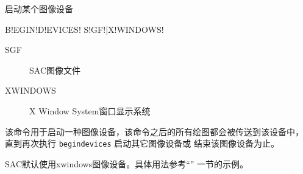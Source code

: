 \label{cmd:begindevices}

启动某个图像设备

\begin{SACSTX}
B!EGIN!D!EVICES! S!GF!|X!WINDOWS!
\end{SACSTX}

\begin{description}
\item [SGF] SAC图像文件
\item [XWINDOWS] X Window System窗口显示系统
\end{description}

该命令用于启动一种图像设备，该命令之后的所有绘图都会被传送到该设备中，
直到再次执行 \texttt{begindevices} 启动其它图像设备或
 结束该图像设备为止。

SAC默认使用xwindows图像设备。具体用法参考``''
一节的示例。
